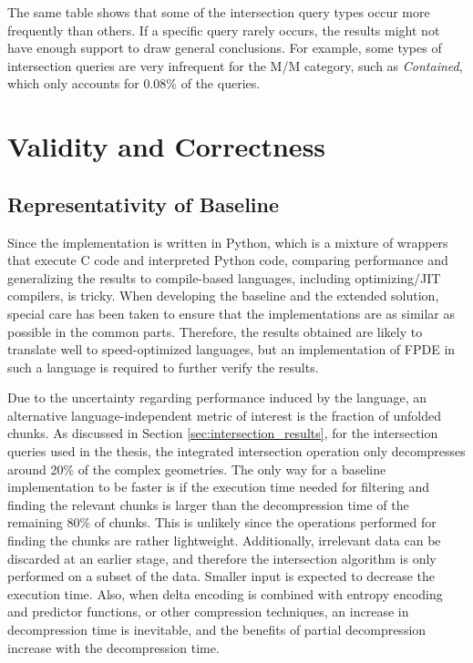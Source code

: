 The same table shows that some of the intersection query types occur more frequently than others. If a specific query rarely occurs, the results might not have enough support to draw general conclusions. For example, some types of intersection queries are very infrequent for the M/M category, such as \textit{Contained}, which only accounts for $0.08\%$ of the queries.



\section{Validity and Correctness}
\subsection{Representativity of Baseline}
Since the implementation is written in Python, which is a mixture of wrappers that execute C code and interpreted Python code, comparing performance and generalizing the results to compile-based languages, including optimizing/JIT compilers, is tricky. When developing the baseline and the extended solution, special care has been taken to ensure that the implementations are as similar as possible in the common parts. Therefore, the results obtained are likely to translate well to speed-optimized languages, but an implementation of FPDE in such a language is required to further verify the results.

Due to the uncertainty regarding performance induced by the language, an alternative language-independent metric of interest is the fraction of unfolded chunks. As discussed in Section \ref{sec:intersection_results}, for the intersection queries used in the thesis, the integrated intersection operation only decompresses around 20\% of the complex geometries. The only way for a baseline implementation to be faster is if the execution time needed for filtering and finding the relevant chunks is larger than the decompression time of the remaining 80\% of chunks. This is unlikely since the operations performed for finding the chunks are rather lightweight. Additionally, irrelevant data can be discarded at an earlier stage, and therefore the intersection algorithm is only performed on a subset of the data. Smaller input is expected to decrease the execution time. Also, when delta encoding is combined with entropy encoding and predictor functions, or other compression techniques, an increase in decompression time is inevitable, and the benefits of partial decompression increase with the decompression time.

